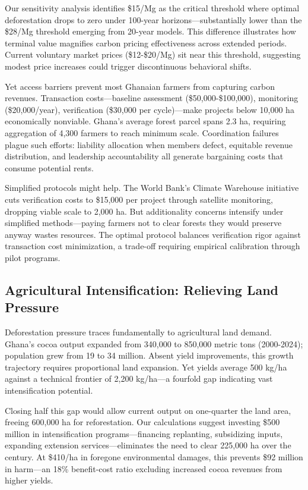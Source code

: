 Our sensitivity analysis identifies \$15/Mg as the critical threshold where optimal deforestation drops to zero under 100-year horizons—substantially lower than the \$28/Mg threshold emerging from 20-year models. This difference illustrates how terminal value magnifies carbon pricing effectiveness across extended periods. Current voluntary market prices (\$12-\$20/Mg) sit near this threshold, suggesting modest price increases could trigger discontinuous behavioral shifts.

Yet access barriers prevent most Ghanaian farmers from capturing carbon revenues. Transaction costs—baseline assessment (\$50,000-\$100,000), monitoring (\$20,000/year), verification (\$30,000 per cycle)—make projects below 10,000 ha economically nonviable. Ghana's average forest parcel spans 2.3 ha, requiring aggregation of 4,300 farmers to reach minimum scale. Coordination failures plague such efforts: liability allocation when members defect, equitable revenue distribution, and leadership accountability all generate bargaining costs that consume potential rents.

Simplified protocols might help. The World Bank's Climate Warehouse initiative cuts verification costs to \$15,000 per project through satellite monitoring, dropping viable scale to 2,000 ha. But additionality concerns intensify under simplified methods—paying farmers not to clear forests they would preserve anyway wastes resources. The optimal protocol balances verification rigor against transaction cost minimization, a trade-off requiring empirical calibration through pilot programs.

\subsection{Agricultural Intensification: Relieving Land Pressure}

Deforestation pressure traces fundamentally to agricultural land demand. Ghana's cocoa output expanded from 340,000 to 850,000 metric tons (2000-2024); population grew from 19 to 34 million. Absent yield improvements, this growth trajectory requires proportional land expansion. Yet yields average 500 kg/ha against a technical frontier of 2,200 kg/ha—a fourfold gap indicating vast intensification potential.

Closing half this gap would allow current output on one-quarter the land area, freeing 600,000 ha for reforestation. Our calculations suggest investing \$500 million in intensification programs—financing replanting, subsidizing inputs, expanding extension services—eliminates the need to clear 225,000 ha over the century. At \$410/ha in foregone environmental damages, this prevents \$92 million in harm—an 18\% benefit-cost ratio excluding increased cocoa revenues from higher yields.

